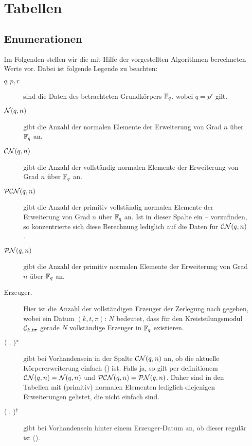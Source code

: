 \chapter{Tabellen}

\section{Enumerationen}
\label{anh:sec:enumerationen}

Im Folgenden stellen wir die mit Hilfe der vorgestellten Algorithmen
berechneten Werte vor. Dabei ist folgende Legende zu beachten:
\begin{description}
  \item[$q, p,r$] sind die Daten des betrachteten Grundkörpers $\F_q$, wobei
    $q = p^r$ gilt.
  \item[$\cal N(q,n)$] gibt die Anzahl der normalen Elemente
    der Erweiterung von Grad $n$ über $\F_q$ an.
  \item[$\CN(q,n)$] gibt die Anzahl der vollständig normalen Elemente
    der Erweiterung von Grad $n$ über $\F_q$ an.
  \item[$\PCN(q,n)$] gibt die Anzahl der primitiv vollständig normalen Elemente 
    der Erweiterung von Grad $n$ über $\F_q$ an. Ist in dieser Spalte ein
    -- vorzufinden, so konzentrierte sich diese Berechnung lediglich auf 
    die Daten für $\CN(q,n)$.
  \item[$\PN(q,n)$] gibt die Anzahl der primitiv normalen Elemente 
    der Erweiterung von Grad $n$ über $\F_q$ an.
  \item[\normalfont Erzeuger.] Hier ist die Anzahl der vollständigen Erzeuger
    der Zerlegung nach  gegeben, wobei ein Datum
    $(k,t,\pi):\, N$ bedeutet, dass für den Kreisteilungsmodul 
    $\C_{k,t\pi}$ gerade $N$ vollständige Erzeuger in $\F_q$ existieren.
  \item[$(\speq.)^\ast$] gibt bei Vorhandensein in der Spalte $\CN(q,n)$ an, 
    ob die aktuelle Körpererweiterung einfach () ist.
    Falls ja, so gilt per definitionem 
    $\CN(q,n) = \cal N(q,n)$ und $\PCN(q,n) = \PN(q,n)$.
    Daher sind in den Tabellen mit (primitiv) normalen Elementen lediglich
    diejenigen Erweiterungen gelistet, die nicht einfach sind.
  \item[$(\speq.)^\dagger$] gibt bei Vorhandensein hinter einem Erzeuger-Datum
    an, ob dieser regulär ist ().
\end{description}

